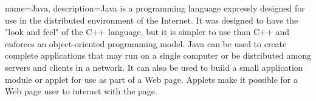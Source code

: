 {
    name=Java,
    description={Java is a programming language expressly designed for use in the distributed environment of the Internet. It was designed to have the "look and feel" of the C++ language, but it is simpler to use than C++ and enforces an object-oriented programming model. Java can be used to create complete applications that may run on a single computer or be distributed among servers and clients in a network. It can also be used to build a small application module or applet for use as part of a Web page. Applets make it possible for a Web page user to interact with the page.}
}
